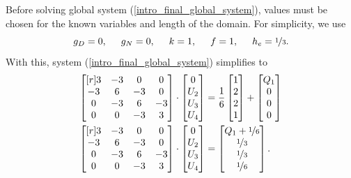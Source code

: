 Before solving global system (\ref{intro_final_global_system}), values must be chosen for the known variables and length of the domain.  For simplicity, we use
$$g_D = 0, \hspace{5mm} g_N = 0, \hspace{5mm} k = 1, \hspace{5mm} f=1, \hspace{5mm} h_e = \nicefrac{1}{3}.$$
With this, system (\ref{intro_final_global_system}) simplifies to
\begin{align}
  \begin{bmatrix}[r]
     3 & -3 &  0 &  0 \\
    -3 &  6 & -3 &  0 \\
     0 & -3 &  6 & -3 \\
     0 &  0 & -3 &  3 \\
  \end{bmatrix} \cdot
  \begin{bmatrix} 0   \\ U_2 \\ U_3 \\ U_4 \end{bmatrix} &=
  \frac{1}{6}
  \begin{bmatrix} 1   \\ 2   \\ 2   \\ 1   \end{bmatrix} +
  \begin{bmatrix} Q_1 \\ 0   \\ 0   \\ 0   \end{bmatrix} \notag \\
  \label{intro_full_matrix}
  \begin{bmatrix}[r]
     3 & -3 &  0 &  0 \\
    -3 &  6 & -3 &  0 \\
     0 & -3 &  6 & -3 \\
     0 &  0 & -3 &  3 \\
  \end{bmatrix} \cdot
  \begin{bmatrix} 0   \\ U_2 \\ U_3 \\ U_4 \end{bmatrix} &=
  \begin{bmatrix} Q_1 + \nicefrac{1}{6} \\ \nicefrac{1}{3} \\ \nicefrac{1}{3} \\ \nicefrac{1}{6} \end{bmatrix}.
\end{align}

